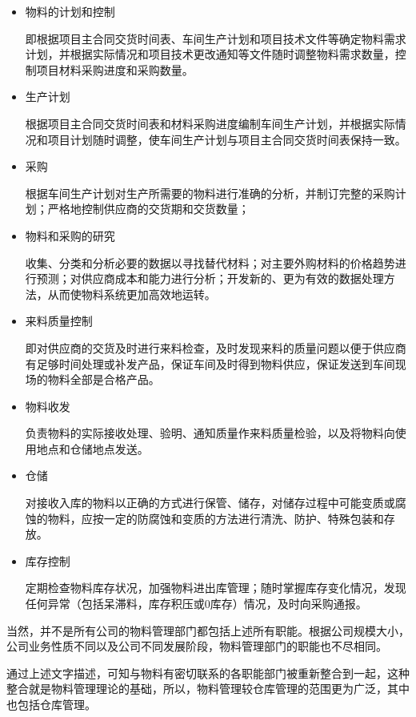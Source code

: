    \begin{itemize}
    \item  物料的计划和控制

        即根据项目主合同交货时间表、车间生产计划和项目技术文件等确定物料需求计划，并根据实际情况和项目技术更改通知等文件随时调整物料需求数量，控制项目材料采购进度和采购数量。

    \item  生产计划

        根据项目主合同交货时间表和材料采购进度编制车间生产计划，并根据实际情况和项目计划随时调整，使车间生产计划与项目主合同交货时间表保持一致。

    \item  采购

    根据车间生产计划对生产所需要的物料进行准确的分析，并制订完整的采购计划；严格地控制供应商的交货期和交货数量；

    \item  物料和采购的研究

        收集、分类和分析必要的数据以寻找替代材料；对主要外购材料的价格趋势进行预测；对供应商成本和能力进行分析；开发新的、更为有效的数据处理方法，从而使物料系统更加高效地运转。

    \item  来料质量控制

        即对供应商的交货及时进行来料检查，及时发现来料的质量问题以便于供应商有足够时间处理或补发产品，保证车间及时得到物料供应，保证发送到车间现场的物料全部是合格产品。

    \item  物料收发

        负责物料的实际接收处理、验明、通知质量作来料质量检验，以及将物料向使用地点和仓储地点发送。

    \item  仓储

        对接收入库的物料以正确的方式进行保管、储存，对储存过程中可能变质或腐蚀的物料，应按一定的防腐蚀和变质的方法进行清洗、防护、特殊包装和存放。

    \item  库存控制

        定期检查物料库存状况，加强物料进出库管理；随时掌握库存变化情况，发现任何异常（包括呆滞料，库存积压或0库存）情况，及时向采购通报。

    \end{itemize}

    当然，并不是所有公司的物料管理部门都包括上述所有职能。根据公司规模大小，公司业务性质不同以及公司不同发展阶段，物料管理部门的职能也不尽相同。

    通过上述文字描述，可知与物料有密切联系的各职能部门被重新整合到一起，这种整合就是物料管理理论的基础，所以，物料管理较仓库管理的范围更为广泛，其中也包括仓库管理。
